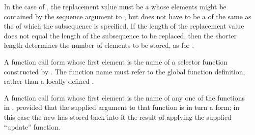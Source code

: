 In the case of , the replacement value must be a 
whose elements might be contained by the sequence argument to ,
but does not have to be a  of the same  
as the  of which the subsequence is specified.
If the length of the replacement value does not equal the length of
the subsequence to be replaced, then the shorter length determines
the number of elements to be stored, as for .

  
\itemitem{\bull}
A function call form whose first element is the name of
a selector function constructed by .
The function name must refer to the global function definition,
rather than a locally defined .

% 
% 

\itemitem{\bull}
A function call form whose first element is the name of
any one of the functions in \thenextfigure, 
provided that the supplied argument
to that function is in turn a  form;
in this case the new  has stored back into it the
result of applying the supplied ``update'' function.

